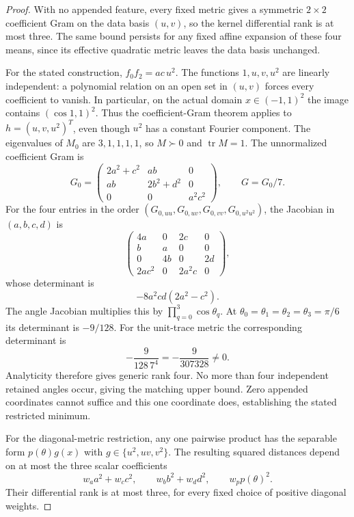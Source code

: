 \begin{proof}
With no appended feature, every fixed metric gives a symmetric
$2\times2$ coefficient Gram on the data basis $(u,v)$, so the kernel
differential rank is at most three. The same bound persists for any
fixed affine expansion of these four means, since its effective
quadratic metric leaves the data basis unchanged.

For the stated construction, $f_0f_2=ac\,u^2$. The functions
$1,u,v,u^2$ are linearly independent: a polynomial relation on an
open set in $(u,v)$ forces every coefficient to vanish. In
particular, on the actual domain $x\in(-1,1)^2$ the image contains
$(\cos1,1)^2$. Thus the coefficient-Gram theorem applies to
$h=(u,v,u^2)^T$, even though $u^2$ has a constant Fourier component.
The eigenvalues of $M_0$ are $3,1,1,1,1$, so $M\succ0$ and
$\operatorname{tr}M=1$. The unnormalized coefficient Gram is
\[
 G_0=\begin{pmatrix}
 2a^2+c^2&ab&0\\ab&2b^2+d^2&0\\0&0&a^2c^2
 \end{pmatrix},\qquad G=G_0/7.
\]
For the four entries in the order
$(G_{0,uu},G_{0,uv},G_{0,vv},G_{0,u^2u^2})$, the Jacobian in
$(a,b,c,d)$ is
\[
 \begin{pmatrix}
 4a&0&2c&0\\b&a&0&0\\0&4b&0&2d\\
 2ac^2&0&2a^2c&0
 \end{pmatrix},
\]
whose determinant is
\[
 -8a^2cd(2a^2-c^2).
\]
The angle Jacobian multiplies this by
$\prod_{q=0}^3\cos\theta_q$. At
$\theta_0=\theta_1=\theta_2=\theta_3=\pi/6$ its determinant is
$-9/128$. For the unit-trace metric the corresponding determinant is
\[
 -\frac{9}{128\,7^4}=-\frac{9}{307328}\ne0.
\]
Analyticity therefore gives generic rank four. No more than four
independent retained angles occur, giving the matching upper bound.
Zero appended coordinates cannot suffice and this one coordinate
does, establishing the stated restricted minimum.

For the diagonal-metric restriction, any one pairwise product has
the separable form $p(\theta)g(x)$ with
$g\in\{u^2,uv,v^2\}$. The resulting squared distances depend on
at most the three scalar coefficients
\[
 w_a a^2+w_c c^2,\qquad w_b b^2+w_d d^2,\qquad
 w_p p(\theta)^2.
\]
Their differential rank is at most three, for every fixed choice of
positive diagonal weights.
\end{proof}

